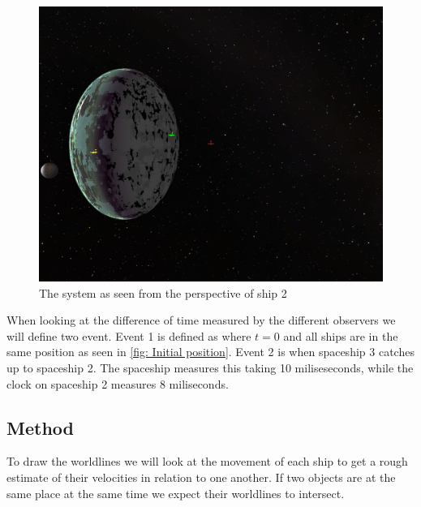 \documentclass[reprint,english,notitlepage]{revtex4-2}
\begin{document}
  \begin{figure}[h!]
    \centering
    \includegraphics[scale = .125]{figures/2_perspective.png}
    \caption{The system as seen from the perspective of ship 2}
    \label{fig: Situation 2}
  \end{figure}
  
  When looking at the difference of time measured by the different observers we will define two event. Event 1 is defined as where $ t = 0 $ and all ships are in the same position as seen in \ref{fig: Initial position}. Event 2 is when spaceship 3 catches up to spaceship 2. The spaceship measures this taking 10 miliseseconds, while the clock on spaceship 2 measures 8 miliseconds. 

  \subsection{Method}
  To draw the worldlines we will look at the movement of each ship to get a rough estimate of their velocities in relation to one another. If two objects are at the same place at the same time we expect their worldlines to intersect.
\end{document}
